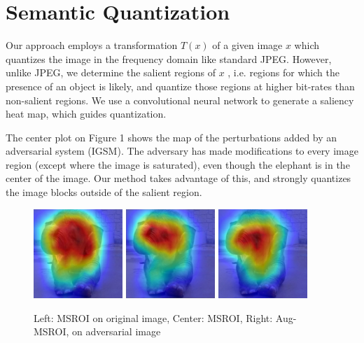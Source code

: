 \section{Semantic Quantization}

Our approach employs a transformation $T(x)$ of a given image $x$ which quantizes the image in the frequency domain like standard JPEG.
However, unlike JPEG, we determine the salient regions of $x$ , i.e. regions for which the presence of an object is likely, and quantize those regions at higher bit-rates than non-salient regions.
We use a convolutional neural network to generate a saliency heat map, %
which guides quantization.

The center plot on Figure 1 shows the map of the perturbations added by an adversarial system (IGSM). The adversary has made modifications to every image region (except where the image is saturated), even though the elephant is in the center of the image. Our method takes advantage of this, and strongly quantizes the image blocks outside of the salient region. %

\begin{figure}[H]
\centering
     \includegraphics[width=0.3\textwidth,angle=0,scale=0.7]{figures/protect/original_msroi.jpg}
     \includegraphics[width=0.3\textwidth,angle=0,scale=0.7]{figures/protect/adversarial_msroi.jpg}
     \includegraphics[width=0.3\textwidth,angle=0,scale=0.7]{figures/protect/MSROI_after.jpg}
     \label{fig:msroi}
          \caption[Multi-Structure ROI]{Left: MSROI on original image, Center: MSROI, Right: Aug-MSROI, on adversarial image}
 \end{figure}
 

